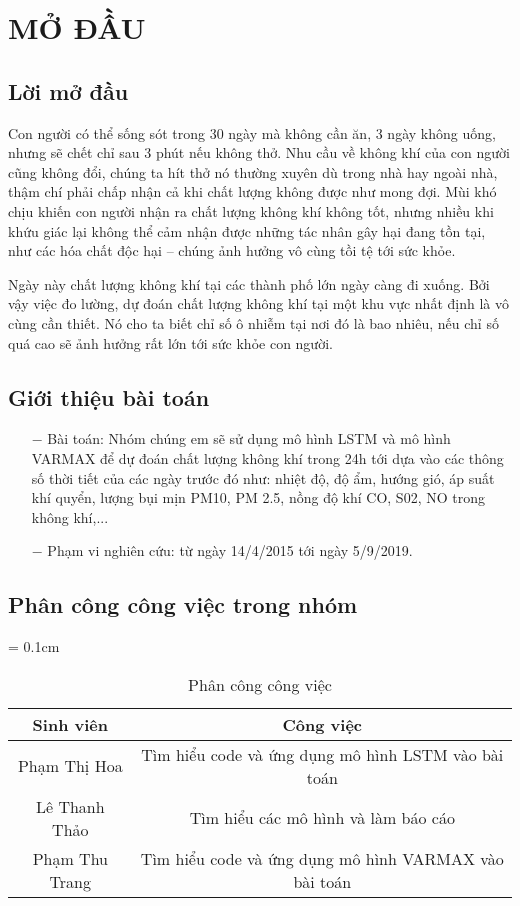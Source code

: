 \setcounter{page}{1}
\chapter{MỞ ĐẦU}
\section{Lời mở đầu}
Con người có thể sống sót trong 30 ngày mà không cần ăn, 3 ngày không uống, nhưng sẽ chết chỉ sau 3 phút nếu không thở. Nhu cầu về không khí của con người cũng không đổi, chúng ta hít thở nó thường xuyên dù trong nhà hay ngoài nhà, thậm chí phải chấp nhận cả khi chất lượng không được như mong đợi. Mùi khó chịu khiến con người nhận ra chất lượng không khí không tốt, nhưng nhiều khi khứu giác lại không thể cảm nhận được những tác nhân gây hại đang tồn tại, như các hóa chất độc hại – chúng ảnh hưởng vô cùng tồi tệ tới sức khỏe.

Ngày này chất lượng không khí tại các thành phố lớn ngày càng đi xuống. Bởi vậy việc đo lường, dự đoán chất lượng không khí tại một khu vực nhất định là vô cùng cần thiết. Nó cho ta biết chỉ số ô nhiễm tại nơi đó là bao nhiêu, nếu chỉ số quá cao sẽ ảnh hưởng rất lớn tới sức khỏe con người. 

\section{Giới thiệu bài toán}
\begin{itemize}
    \item [$-$]Bài toán: Nhóm chúng em sẽ sử dụng mô hình LSTM và mô hình VARMAX để dự đoán chất lượng không khí trong 24h tới dựa vào các thông số thời tiết của các ngày trước đó như: nhiệt độ, độ ẩm, hướng gió, áp suất khí quyển, lượng bụi mịn PM10, PM 2.5, nồng độ khí CO, S02, NO trong không khí,...

    \item [$-$]Phạm vi nghiên cứu: từ ngày 14/4/2015 tới ngày 5/9/2019.
\end{itemize}

\newpage
\section{Phân công công việc trong nhóm}
\begin{table}[h!]
    \centering
    \tabcolsep = 0.1cm
    \begin{tabular}{|c|c|}
        \hline
        \textbf{Sinh viên} & \textbf{Công việc}\\ 
        \hline
        Phạm Thị Hoa & Tìm hiểu code và ứng dụng mô hình LSTM vào bài toán\\
        \hline
        Lê Thanh Thảo & Tìm hiểu các mô hình và làm báo cáo\\
        \hline
        Phạm Thu Trang & Tìm hiểu code và ứng dụng mô hình VARMAX vào bài toán\\ 
        \hline
    \end{tabular}
    \caption{Phân công công việc}
\end{table}